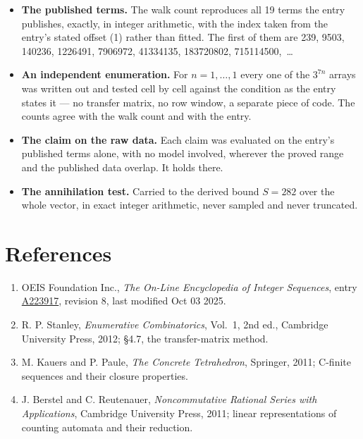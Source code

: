 \documentclass[11pt]{article}
\theoremstyle{definition}
\begin{document}
\begin{itemize}

\item {\bfseries The published terms.} The walk count reproduces all 19 terms the entry publishes, exactly, in integer arithmetic, with the index taken from the entry's stated offset (1) rather than fitted. The first of them are 239, 9503, 140236, 1226491, 7906972, 41334135, 183720802, 715114500,~\dots

\item {\bfseries An independent enumeration.} For $n = 1,\dots,1$ every one of the $3^{7n}$ arrays was written out and tested cell by cell against the condition as the entry states it --- no transfer matrix, no row window, a separate piece of code. The counts agree with the walk count and with the entry.

\item {\bfseries The claim on the raw data.} Each claim was evaluated on the entry's published terms alone, with no model involved, wherever the proved range and the published data overlap. It holds there.

\item {\bfseries The annihilation test.} Carried to the derived bound $S = 282$ over the whole vector, in exact integer arithmetic, never sampled and never truncated.

\end{itemize}

\section{References}

\begin{enumerate}

\item OEIS Foundation Inc., \emph{The On-Line Encyclopedia of Integer Sequences}, entry \href{https://oeis.org/A223917}{A223917}, revision 8, last modified Oct 03 2025.

\item R. P. Stanley, \emph{Enumerative Combinatorics}, Vol.~1, 2nd ed., Cambridge University Press, 2012; \S4.7, the transfer-matrix method.

\item M. Kauers and P. Paule, \emph{The Concrete Tetrahedron}, Springer, 2011; C-finite sequences and their closure properties.

\item J. Berstel and C. Reutenauer, \emph{Noncommutative Rational Series with Applications}, Cambridge University Press, 2011; linear representations of counting automata and their reduction.

\end{enumerate}
\end{document}
